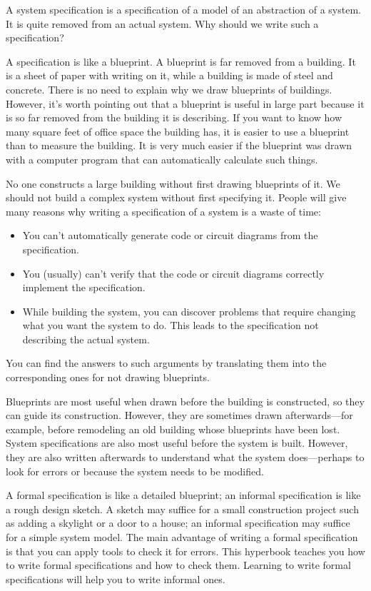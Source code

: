 A system specification is a specification of a model of an abstraction
of a system.  It is quite removed from an actual system.  Why should
we write such a specification?

A specification is like a 
blueprint.  A blueprint is far removed from a building.  It is a sheet
of paper with writing on it, while a building is made of steel and
concrete.  There is no need to explain why we draw blueprints of
buildings.  However, it's worth pointing out that a blueprint is
useful in large part because it is so far removed from the building it
is describing.  If you want to know how many square feet of office
space the building has, it is easier to use a blueprint than to
measure the building.  It is very much easier if the blueprint was
drawn with a computer program that can automatically calculate such
things.

No one constructs a large building without first drawing blueprints of
it.  We should not build a complex system without first specifying it.
People will give many reasons why writing a specification of a
system is a waste of time:
\begin{itemize}
\item You can't automatically generate code or circuit diagrams from
the specification.

\item You (usually) can't verify that the code or circuit diagrams
correctly implement the specification.

\item While building the system, you can discover problems that
require changing what you want the system to do.  This leads to the
specification not describing the actual system.
\end{itemize}
You can find the answers to such arguments by translating them into
the corresponding ones for not drawing blueprints.

Blueprints are most useful when drawn before the building is
constructed, so they can guide its construction.  However, they are
sometimes drawn afterwards---for example, before remodeling an old
building whose blueprints have been lost.  System specifications are
also most useful before the system is built.  However, they are also
written afterwards to understand what the system does---perhaps to
look for errors or because the system needs to be modified.

A formal specification is like a detailed blueprint; an informal
specification is like a rough design sketch.  A sketch may suffice for
a small construction project such as adding a skylight or a door to a
house; an informal specification may suffice for a simple system model.
The main advantage of writing a formal specification is that you can
apply tools to check it for errors.  This hyperbook teaches you how to
write formal specifications and how to check them.  Learning to write
formal specifications will help you to write informal ones.

